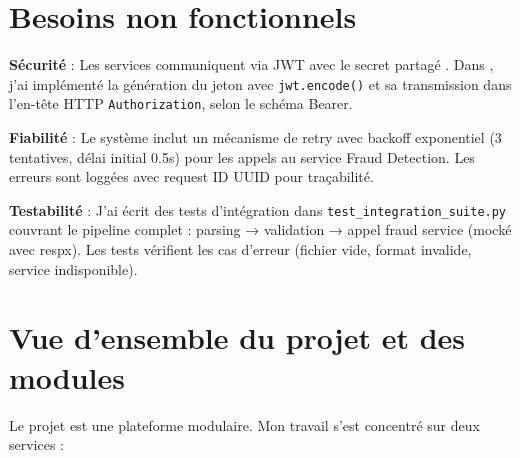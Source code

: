 \documentclass[12pt,a4paper]{extreport}
\begin{document}
\section{Besoins non fonctionnels}

\textbf{Sécurité} : Les services communiquent via JWT avec le secret partagé . Dans , j'ai implémenté la génération du jeton avec \texttt{jwt.encode()} et sa transmission dans l'en-tête HTTP \texttt{Authorization}, selon le schéma Bearer.

\textbf{Fiabilité} : Le système inclut un mécanisme de retry avec backoff exponentiel (3 tentatives, délai initial 0.5s) pour les appels au service Fraud Detection. Les erreurs sont loggées avec request ID UUID pour traçabilité.

\textbf{Testabilité} : J'ai écrit des tests d'intégration dans \texttt{test\_integration\_suite.py} couvrant le pipeline complet : parsing → validation → appel fraud service (mocké avec respx). Les tests vérifient les cas d'erreur (fichier vide, format invalide, service indisponible).

\section{Vue d'ensemble du projet et des modules}

Le projet est une plateforme modulaire. Mon travail s'est concentré sur deux services :
\end{document}
